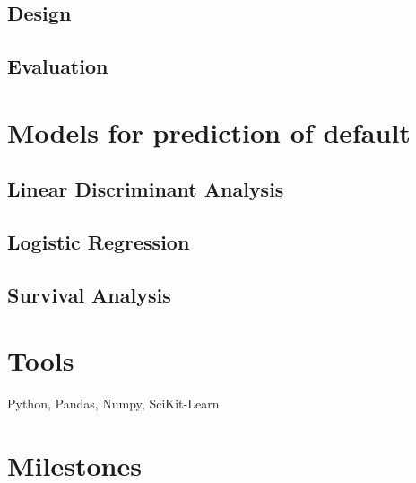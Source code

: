 \documentclass[sigconf, 11pt]{acmart}
\begin{document}
\subsection{Design}
\subsection{Evaluation}

\section{Models for prediction of default}
\subsection{Linear Discriminant Analysis}
\subsection{Logistic Regression}
\subsection{Survival Analysis}


\section{Tools}
Python, Pandas, Numpy, SciKit-Learn
\section{Milestones}


\end{document}
